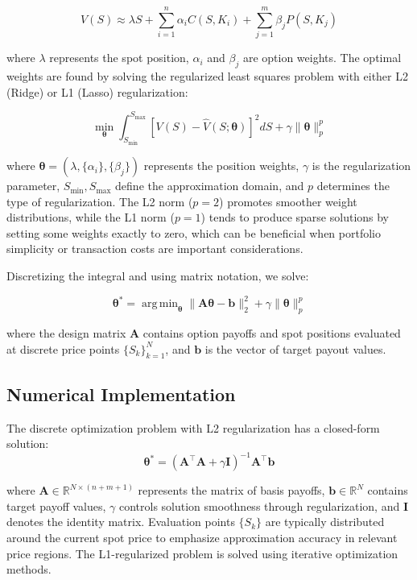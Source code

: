 \documentclass[12pt]{article}
\DeclareMathOperator*{\argmin}{arg\,min}
\begin{document}
\begin{equation}
V(S) \approx \lambda S + \sum_{i=1}^{n} \alpha_i C(S, K_i) + \sum_{j=1}^{m} \beta_j P(S, K_j)
\end{equation}

where \( \lambda \) represents the spot position, \( \alpha_i \) and \( \beta_j \) are
option weights. The optimal weights are found by solving the regularized least squares
problem with either L2 (Ridge) or L1 (Lasso) regularization:

\begin{equation}
\min_{\boldsymbol{\theta}} \int_{S_{\min}}^{S_{\max}} \left[ V(S) - \hat{V}(S;\boldsymbol{\theta}) \right]^2 dS + \gamma \|\boldsymbol{\theta}\|_p^p
\end{equation}

where \( \boldsymbol{\theta} = (\lambda, \{\alpha_i\}, \{\beta_j\}) \) represents
the position weights, \( \gamma \) is the regularization parameter, 
\( S_{\min}, S_{\max} \) define the approximation domain, and \( p \) determines
the type of regularization. The L2 norm (\(p=2\)) promotes smoother weight distributions,
while the L1 norm (\(p=1\)) tends to produce sparse solutions by setting some weights
exactly to zero, which can be beneficial when portfolio simplicity or transaction costs
are important considerations.

Discretizing the integral and using matrix notation, we solve:

\begin{equation}
\boldsymbol{\theta}^* = \argmin_{\boldsymbol{\theta}} \|\mathbf{A}\boldsymbol{\theta} - \mathbf{b}\|_2^2 + \gamma \|\boldsymbol{\theta}\|_p^p
\end{equation}

where the design matrix \( \mathbf{A} \) contains option payoffs and spot positions
evaluated at discrete price points \( \{S_k\}_{k=1}^N \), and \( \mathbf{b} \) is
the vector of target payout values.

\subsection{Numerical Implementation}
The discrete optimization problem with L2 regularization has a closed-form solution:
\begin{equation}
\boldsymbol{\theta}^* = (\mathbf{A}^\top \mathbf{A} + \gamma \mathbf{I})^{-1} \mathbf{A}^\top \mathbf{b}
\end{equation}

where $\mathbf{A} \in \mathbb{R}^{N \times (n+m+1)}$ represents the matrix of basis payoffs, $\mathbf{b} \in \mathbb{R}^N$ contains target payoff values, $\gamma$ controls solution smoothness through regularization, and $\mathbf{I}$ denotes the identity matrix. Evaluation points $\{S_k\}$ are typically distributed around the current spot price to emphasize approximation accuracy in relevant price regions. The L1-regularized problem is solved using iterative optimization methods.
\end{document}
